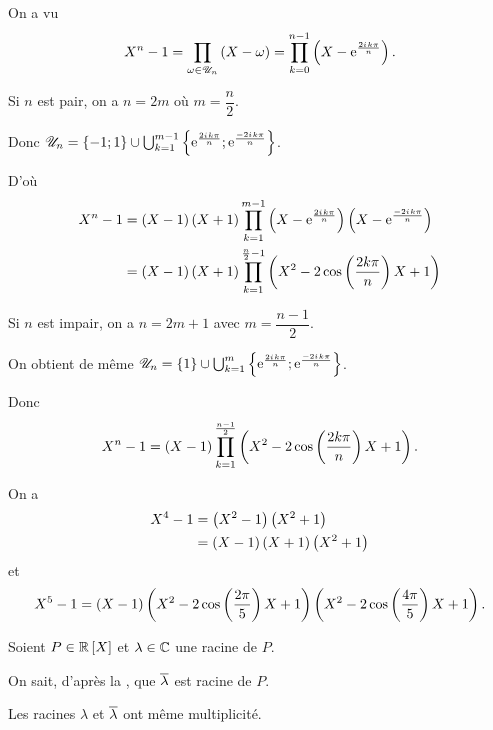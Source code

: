 \begin{corr}
On a vu \[X^n-1=\prod_{\omega\in\mathscr{U}_n}\left(X-\omega\right)=\prod_{k=0}^{n-1}\left(X-\mathrm{e}^{\frac{2i\mkern1mu k\pi}{n}}\right).\]

Si \(n\) est pair, on a \(n=2m\) où \(m=\dfrac{n}{2}\).

Donc \(\mathscr{U}_n=\left\lbrace-1;1\right\rbrace\cup\bigcup_{k=1}^{m-1}\left\lbrace\mathrm{e}^{\frac{2i\mkern1mu k\pi}{n}};\mathrm{e}^{\frac{-2i\mkern1mu k\pi}{n}}\right\rbrace\).

D'où \[\begin{aligned}
X^n-1&=\left(X-1\right)\left(X+1\right)\prod_{k=1}^{m-1}\left(X-\mathrm{e}^{\frac{2i\mkern1mu k\pi}{n}}\right)\left(X-\mathrm{e}^{\frac{-2i\mkern1mu k\pi}{n}}\right) \\
&=\left(X-1\right)\left(X+1\right)\prod_{k=1}^{\frac{n}{2}-1}\left(X^2-2\cos\left(\dfrac{2k\pi}{n}\right)X+1\right)
\end{aligned}\]

Si \(n\) est impair, on a \(n=2m+1\) avec \(m=\dfrac{n-1}{2}\).

On obtient de même \(\mathscr{U}_n=\left\lbrace1\right\rbrace\cup\bigcup_{k=1}^m\left\lbrace\mathrm{e}^{\frac{2i\mkern1mu k\pi}{n}};\mathrm{e}^{\frac{-2i\mkern1mu k\pi}{n}}\right\rbrace\).

Donc \[X^n-1=\left(X-1\right)\prod_{k=1}^{\frac{n-1}{2}}\left(X^2-2\cos\left(\dfrac{2k\pi}{n}\right)X+1\right).\]
\end{corr}

\begin{ex}
On a \[\begin{aligned}
X^4-1&=\left(X^2-1\right)\left(X^2+1\right) \\
&=\left(X-1\right)\left(X+1\right)\left(X^2+1\right)
\end{aligned}\] et \[X^5-1=\left(X-1\right)\left(X^2-2\cos\left(\dfrac{2\pi}{5}\right)X+1\right)\left(X^2-2\cos\left(\dfrac{4\pi}{5}\right)X+1\right).\]
\end{ex}

\begin{prop}
Soient \(P\in\poly[\R]\) et \(\lambda\in\mathbb{C}\) une racine de \(P\).

On sait, d'après la , que \(\overline{\lambda}\) est racine de \(P\).

Les racines \(\lambda\) et \(\overline{\lambda}\) ont même multiplicité.
\end{prop}

